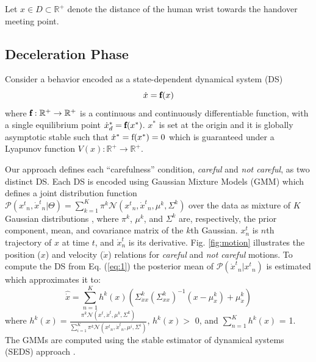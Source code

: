 Let $x \in D \subset \mathbb{R}^{+}$ denote the distance of the human wrist towards the handover meeting point. 

\subsection{Deceleration Phase}

Consider a behavior encoded as a state-dependent dynamical system (DS)
%
\begin{equation}
\dot{x} = \pmb{\textnormal{f}}(x)
\label{eq:1}
\end{equation}
where $\pmb{\textnormal{f}}:\mathbb{R}^{+} \to \mathbb{R}^{+}$ is a continuous and continuously differentiable function, with a single equilibrium point ${\dot{x}_d}^* = \pmb{\textnormal{f}}(x^*)$. $x^{*}$ is set at the origin and it is globally asymptotic stable such that $\dot{x}^* = \textnormal{f}(x^{*}) = 0$ which is guaranteed under a Lyapunov function $V(x):\mathbb{R}^{+} \rightarrow \mathbb{R}^{+}$.

Our approach defines each ``carefulness'' condition, \textit{careful} and \textit{not careful}, as two distinct DS. Each DS is encoded using Gaussian Mixture Models (GMM) which defines a joint distribution function $\mathcal{P}({{x}^{t}}_n, {\dot{x}^{t}}_n | \Theta) = \sum_{k=1}^{K} \pi^{k} \mathcal{N}({{x}^{t}}_n, {\dot{x}^{t}}_n, \mu^{k}, \Sigma^{k})$ over the data as mixture of $K$ Gaussian distributions \cite{khansari2011learning}, where $\pi^{k}$, $\mu^{k}$, and $\Sigma^{k}$ are, respectively, the prior component, mean, and covariance matrix of the $k$th Gaussian. $x_n^t$ is $n$th trajectory of $x$ at time $t$, and $\dot{x}_n^t$ is its derivative. Fig. \ref{fig:motion} illustrates the position ($x$) and velocity ($\dot{x}$) relations for \textit{careful} and \textit{not careful} motions. To compute the DS from Eq. (\ref{eq:1}) the posterior mean of $\mathcal{P}({\dot{x}^{t}}_n|{{x}^{t}}_n)$ is estimated which approximates it to:
%
\begin{equation}
\hat{\dot{x}} = \sum_{n=1}^{K} h^{k}(x) (\Sigma^{k}_{\dot{x}x}(\Sigma^{k}_{xx})^{-1} (x - \mu^{k}_{x}) + \mu^{k}_{\dot{x}})
\label{eq:2}
\end{equation}
where $h^{k}(x) = \frac{\pi^{k} \mathcal{N}({{x}^{t}}, {\dot{x}^{t}}, \mu^{k}, \Sigma^{k})}{\sum_{i=1}^{K} \pi^{k} \mathcal{N}({{x}^{t}}_n, {\dot{x}^{t}}_n, \mu^{i}, \Sigma^{i})}$, $h^{k}(x) > $ 0, and $\sum_{n=1}^{K} h^{k}(x)$ = 1. The GMMs are computed using the stable estimator of dynamical systems (SEDS) approach \cite{khansari2011learning}. 

